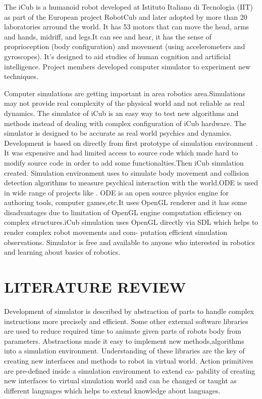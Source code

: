 \documentclass[a4paper, 11pt]{report}
\begin{document}
  The iCub is a humanoid robot developed at Istituto Italiano di Tecnologia 
  (IIT) 
  as part of the European project RobotCub and later adopted by more than 20 
  laboratories arround the world. It has 53 motors that can move the head, arms 
  and hands, midriff, and legs.It can see and hear, it has the sense of 
  proprioception (body configuration) and movement (using accelerometers and 
  gyroscopes).
  It’s designed to aid studies of human cognition and artificial 
  intelligence. Project members developed computer simulator to experiment new 
  techniques.
  \par Computer simulations are getting important in area robotics 
  area.Simulations may not provide real complexity of the physical world and 
  not reliable as real dynamics. The simulator of iCub is an easy way to test 
  new algorithms and methods instead of dealing with complex configuration of 
  iCub hardware. The simulator is designed to be accurate as real world 
  psychics and dynamics. Development is based on directly from first prototype 
  of simulation 
  environment \cite{Webots}. It was expensive and had limited access to 
  source code which made hard to modify source code in order to add some 
  functionalties.Then iCub simulation created. Simulation environment uses 
  \cite{ODE}\linebreak to simulate body movement and collision detection 
  algorithms to 
  measure psychical interaction with the world.ODE is used in wide range of 
  projects like \cite{Gazebo}. ODE is an open source physics engine for 
  authoring tools, computer 
  games,etc.It uses OpenGL renderer and it has some disadvantages due to 
  limitation of OpenGL engine computation efficiency on complex structures.iCub 
  simulation uses OpenGL directly via SDL which helps to render complex robot 
  movements and com- putation efficient simulation observations. Simulator is 
  free and available to anyone who interested in robotics and learning about 
  basics of robotics.
  
  
  \chapter{LITERATURE REVIEW}
  
  Development of simulator is described by abstraction of parts to handle 
  complex 
  instructions more precisely and efficient. Some other external software 
  libraries are used to reduce required time to animate given parts of robots 
  body from parameters. Abstractions made it easy to implement new 
  methods,algorithms into a simulation environment. Understanding of these 
  libraries are the key of creating new interfaces and methods to robot in 
  virtual world.
  Action primitives are pre-defined inside a simulation environment to extend 
  ca- 
  pability of creating new interfaces to virtual simulation world and can be 
  changed or taught as different languages which helps to extend knowledge 
  about 
  languages.
  
\end{document}
